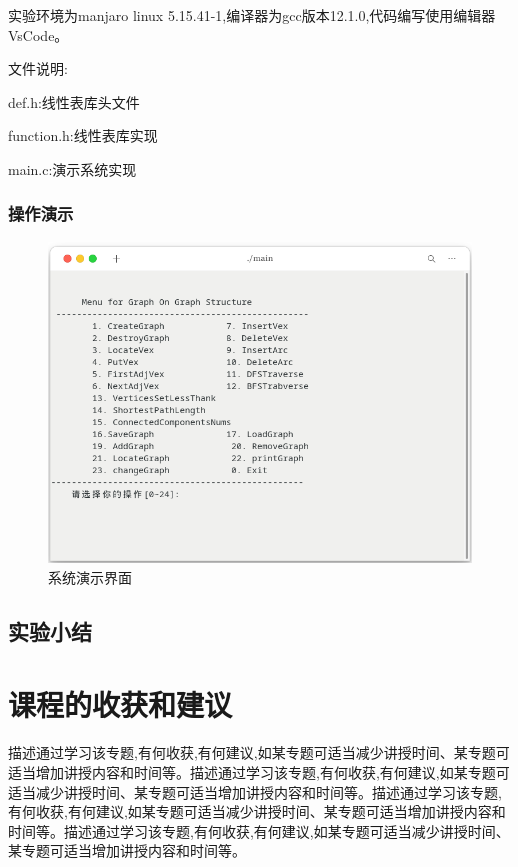 \documentclass[supercite]{Experimental_Report}
\theoremstyle{definition}
\begin{document}
实验环境为manjaro linux 5.15.41-1,编译器为gcc版本12.1.0,代码编写使用编辑器VsCode。

文件说明:

def.h:线性表库头文件

function.h:线性表库实现

main.c:演示系统实现

\subsubsection{操作演示}

\begin{figure}[htb]
	\begin{center}
		\includegraphics[scale=0.60]{images/2-2.png}
		\caption{系统演示界面}
		\label{fig2-2}
	\end{center}
\end{figure}

\subsection{实验小结}

\newpage

\section{课程的收获和建议}

描述通过学习该专题,有何收获,有何建议,如某专题可适当减少讲授时间、某专题可适当增加讲授内容和时间等。描述通过学习该专题,有何收获,有何建议,如某专题可适当减少讲授时间、某专题可适当增加讲授内容和时间等。描述通过学习该专题,有何收获,有何建议,如某专题可适当减少讲授时间、某专题可适当增加讲授内容和时间等。描述通过学习该专题,有何收获,有何建议,如某专题可适当减少讲授时间、某专题可适当增加讲授内容和时间等。
\end{document}

